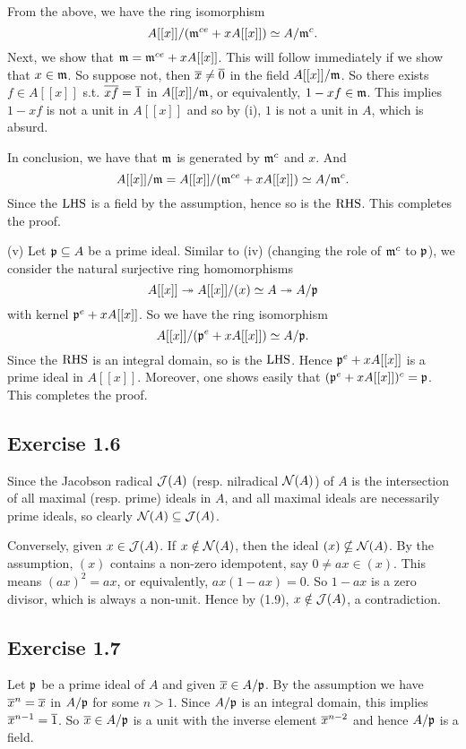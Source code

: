 \documentclass[../A&M.tex]{subfiles}
\begin{document}
From the above, we have the ring isomorphism
$$
A[[x]]/ (\mathfrak{m}^{ce} + xA[[x]]) \simeq A/\mathfrak{m}^c.
$$
Next, we show that $\mathfrak{m} = \mathfrak{m}^{ce} + xA[[x]]$. This will follow immediately if we show that $x\in\mathfrak{m}$. So suppose not, then $\overline{x}\neq\overline{0}$ in the field $A[[x]]/\mathfrak{m}$. So there exists $f\in A[[x]]$ s.t. $\overline{xf}=\overline{1}$ in $A[[x]]/\mathfrak{m}$, or equivalently, $1-xf\in \mathfrak{m}$. This implies $1-xf$ is not a unit in $A[[x]]$ and so by (i), $1$ is not a unit in $A$, which is absurd.

In conclusion, we have that $\mathfrak{m}$ is generated by $\mathfrak{m}^c$ and $x$. And
$$
A[[x]]/\mathfrak{m} = A[[x]]/ (\mathfrak{m}^{ce} + xA[[x]]) \simeq A/\mathfrak{m}^c.
$$
Since the $\operatorname{LHS}$ is a field by the assumption, hence so is the $\operatorname{RHS}$. This completes the proof.

(v) Let $\mathfrak{p}\subseteq A$ be a prime ideal. Similar to (iv) (changing the role of $\mathfrak{m}^c$ to $\mathfrak{p}$), we consider the natural surjective ring homomorphisms
$$
A[[x]] \twoheadrightarrow A[[x]]/(x) \simeq A \twoheadrightarrow A/\mathfrak{p}
$$
with kernel $\mathfrak{p}^e  + xA[[x]]$. So we have the ring isomorphism
$$
A[[x]]/ (\mathfrak{p}^e + xA[[x]]) \simeq A/\mathfrak{p}.
$$
Since the $\operatorname{RHS}$ is an integral domain, so is the $\operatorname{LHS}$. Hence $\mathfrak{p}^e + xA[[x]]$ is a prime ideal in $A[[x]]$. Moreover, one shows easily that $(\mathfrak{p}^e+xA[[x]])^c = \mathfrak{p}$. This completes the proof.

\subsection*{Exercise 1.6}

Since the Jacobson radical $\mathcal{J}(A)$ (resp. nilradical $\mathcal{N}(A)$) of $A$ is the intersection of all maximal (resp. prime) ideals in $A$, and all maximal ideals are necessarily prime ideals, so clearly $\mathcal{N}(A) \subseteq \mathcal{J}(A)$.

Conversely, given $x\in \mathcal{J}(A)$. If $x\notin\mathcal{N}(A)$, then the ideal $(x)\nsubseteq\mathcal{N}(A)$. By the assumption, $(x)$ contains a non-zero idempotent, say $0\neq ax\in(x)$. This means $(ax)^2=ax$, or equivalently, $ax(1-ax)=0$. So $1-ax$ is a zero divisor, which is always a non-unit. Hence by (1.9), $x\notin\mathcal{J}(A)$, a contradiction.

\subsection*{Exercise 1.7}

Let $\mathfrak{p}$ be a prime ideal of $A$ and given $\overline{x}\in A/\mathfrak{p}$. By the assumption we have $\overline{x}^n=\overline{x}$ in $A/\mathfrak{p}$ for some $n>1$. Since $A/\mathfrak{p}$ is an integral domain, this implies $\overline{x}^{n-1}=\overline{1}$. So $\overline{x}\in A/\mathfrak{p}$ is a unit with the inverse element $\overline{x}^{n-2}$ and hence $A/\mathfrak{p}$ is a field.
\end{document}
